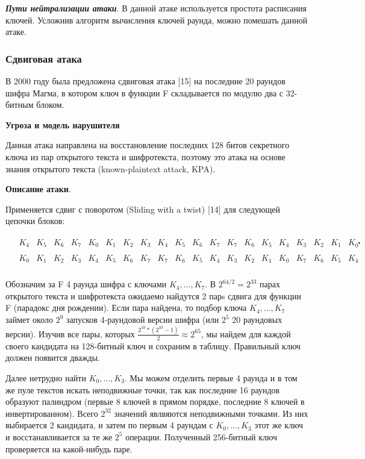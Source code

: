 \documentclass[colorthm]{./civarticle}
\begin{document}
\textbf{\emph{Пути нейтрализации атаки}}. В данной атаке используется простота расписания ключей. Усложнив алгоритм вычисления ключей раунда, можно помешать данной атаке.

\subsubsection{Сдвиговая атака}

В 2000 году была предложена сдвиговая атака [15] на последние 20 раундов шифра Магма, в котором ключ в функции F складывается по модулю два с 32-битным блоком.

\textbf{Угроза и модель нарушителя} 

Данная атака направлена на восстановление последних 128 битов секретного ключа из пар открытого текста и шифротекста, поэтому это атака на основе знания открытого текста (known-plaintext attack, KPA).

\textbf{Описание атаки}.

Применяется сдвиг с поворотом (Sliding with a twist) [14] для следующей цепочки блоков:

\begin{equation}
    \begin{aligned}
& \begin{array}{llllllllllllllllllllllll}
K_4 & K_5 & K_6 & K_7 & K_0 & K_1 & K_2 & K_3 & K_4 & K_5 & K_6 & K_7 & K_7 & K_6 & K_5 & K_4 & K_3 & K_2 & K_1 & K_{0^{\bullet}}
\end{array} \\
& \begin{array}{llllllllllllllllllll}
K_0 & K_1 & K_2 & K_3 & K_4 & K_5 & K_6 & K_7 & K_7 & K_6 & K_5 & K_4 & K_3 & K_2 & K_1 & K_0 & K_7 & K_6 & K_5 & K_4
\end{array} \\
&
\end{aligned}
\end{equation}

Обозначим за F 4 раунда шифра с ключами $K_4, \dots, K_7$. В $2^{64/2}=2^{33}$ парах открытого текста и шифротекста ожидаемо найдутся 2 парs сдвига для функции F (парадокс дня рождении). Если пара найдена, то подбор ключа $K_4, \dots, K_7$ займет около $2^{9}$ запусков 4-раундовой версии шифра (или $2^5$ 20 раундовых версии). Изучив все пары, которых $\frac{2^{33}*(2^{33}-1)}{2} \approx 2^{65}$, мы найдем для каждой своего кандидата на 128-битный ключ и сохраним в таблицу. Правильный ключ должен появится дважды.

Далее нетрудно найти $K_0, \dots, K_3$. Мы можем отделить первые 4 раунда и в том же пуле текстов искать неподвижные точки, так как последние 16 раундов образуют палиндром (первые 8 ключей в прямом порядке, последние 8 ключей в инвертированном). Всего $2^{32}$ значений явлвяются неподвижными точками. Из них выбирается 2 кандидата, и затем по первым 4 раундам с $K_0, \dots, K_3$ этот же ключ и восстанавливается за те же $2^5$ операции. Полученный 256-битный ключ проверяется на какой-нибудь паре.
\end{document}
